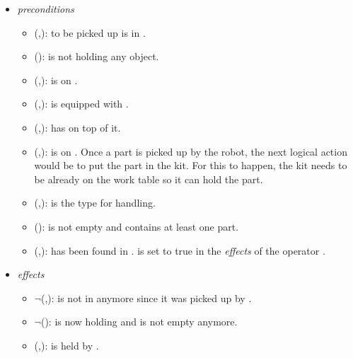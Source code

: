 \begin{enumerate}
\begin{itemize}
 \item \textit{preconditions}
 \begin{itemize}
 \item {}(,):  to be picked up is in .
 \item {}():  is not holding any object.
 \item {}(,):  is on .
 \item {}(,):  is equipped with .
 \item {}(,):  has  on top of it.
 \item {}(,):  is on . Once a part is picked up by the robot, the next logical action would be to put the part in the kit. For this to happen, the kit needs to be already on the work table so it can hold the part.
 \item {}(,):  is the type for  handling.
 \item {}():  is not empty and contains at least one part.
 \item {}(,):  has been found in .  is set to true in the \textit{effects} of the operator .
 \end{itemize}
\item \textit{effects}
 \begin{itemize}
 \item $\neg$(,):  is not in  anymore since it was picked up by .
 \item $\neg$():  is now holding  and is not empty anymore.
 \item  {}(,):  is held by .

\end{itemize}
\end{itemize}
\end{enumerate}
